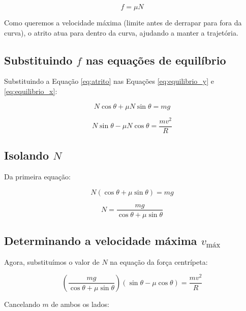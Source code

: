 \documentclass[a4paper,12pt]{article}
\begin{document}
\begin{flushleft}
\begin{equation}
f = \mu N
\label{eq:atrito}
\end{equation}

Como queremos a velocidade máxima (limite antes de derrapar para fora da curva), o atrito atua para dentro da curva, ajudando a manter a trajetória.

\subsection*{Substituindo \( f \) nas equações de equilíbrio}

Substituindo a Equação \eqref{eq:atrito} nas Equações \eqref{eq:equilibrio_y} e \eqref{eq:equilibrio_x}:

\begin{equation}
N \cos\theta + \mu N \sin\theta = mg
\end{equation}

\begin{equation}
N \sin\theta - \mu N \cos\theta = \frac{mv^2}{R}
\end{equation}

\subsection*{Isolando \( N \)}

Da primeira equação:

\begin{equation}
N \left( \cos\theta + \mu \sin\theta \right) = mg
\end{equation}

\begin{equation}
N = \frac{mg}{\cos\theta + \mu \sin\theta}
\label{eq:N}
\end{equation}

\subsection*{Determinando a velocidade máxima \( v_{\text{máx}} \)}

Agora, substituímos o valor de \( N \) na equação da força centrípeta:

\begin{equation}
\left( \frac{mg}{\cos\theta + \mu \sin\theta} \right) \left( \sin\theta - \mu \cos\theta \right) = \frac{mv^2}{R}
\end{equation}

Cancelando \( m \) de ambos os lados:


\end{flushleft}
\end{document}
